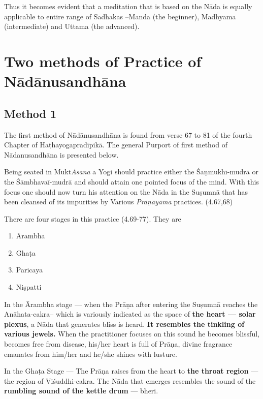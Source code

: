 Thus it becomes evident that a meditation that is based on the Nāda is equally applicable to entire range of Sādhakas –Manda (the beginner), Madhyama (intermediate) and Uttama (the advanced).

\section*{Two methods of Practice of Nādānusandhāna}

\subsection*{Method 1}

The first method of Nādānusandhāna is found from verse 67 to 81 of the fourth Chapter of Haṭhayogapradīpikā. The general Purport of first method of Nādanusandhāna is presented below.

Being seated in Mukt\textit{Āsana} a Yogi should practice either the Śaṇmukhī-mudrā or the Śāmbhavaī-mudrā and should attain one pointed focus of the mind. With this focus one should now turn his attention on the Nāda in the Suṣumnā that has been cleansed of its impurities by Various \textit{Prāṇāyāma} practices. (4.67,68)

There are four stages in this practice (4.69-77). They are

\begin{enumerate}
\itemsep=0pt
\renewcommand{\theenumi}{\alph{enumi}}
\renewcommand{\labelenumi}{\theenumi.}
\item Ārambha 
\item Ghaṭa
\item Paricaya
\item Niṣpatti 
\end{enumerate}

In the Ārambha stage --- when the Prāṇa after entering the Suṣumnā reaches the Anāhata-cakra– which is variously indicated as the space of \textbf{the heart --- solar plexus}, a Nāda that generates bliss is heard. \textbf{It resembles the tinkling of various jewels.} When the practitioner focuses on this sound he becomes blissful, becomes free from disease, his/her heart is full of Prāṇa, divine fragrance emanates from him/her and he/she shines with lusture. 

In the Ghaṭa Stage --- The Prāṇa raises from the heart to \textbf{the throat region} --- the region of Viśuddhi-cakra. The Nāda that emerges resembles the sound of the \textbf{rumbling sound of the kettle drum} --- bheri.

